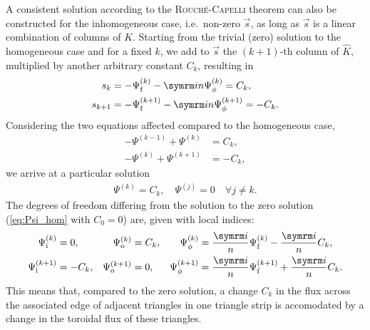 A consistent solution according to the \textsc{Rouché}-\textsc{Capelli} theorem can also be constructed for the inhomogeneous case, i.e.\ non-zero $\vec{s}$, as long as $\vec{s}$ is a linear combination of columns of $K$. Starting from the trivial (zero) solution to the homogeneous case and for a fixed $k$, we add to $\vec{s}$ the $(k+1)$-th column of $\hat{K}$, multiplied by another arbitrary constant $C_{k}$, resulting in
\begin{align}
  s_{k} &= -\Psi_{\fs}^{(k)} - \im n \Psi_{\phi}^{(k)} = C_{k}, \\
  s_{k+1} &= -\Psi_{\fs}^{(k+1)} - \im n \Psi_{\phi}^{(k+1)} = -C_{k}.
\end{align}
Considering the two equations affected compared to the homogeneous case,
\begin{align}
  -\Psi^{(k-1)} + \Psi^{(k)} &= C_{k}, \\
  -\Psi^{(k)} + \Psi^{(k+1)} &= -C_{k},
\end{align}
we arrive at a particular solution
\begin{gather}
  \Psi^{(k)} = C_{k}, \quad \Psi^{(j)} = 0 \quad \forall j \neq k.
\end{gather}
The degrees of freedom differing from the solution to the zero solution (\cref{eq:Psi_hom} with $C_{0} = 0$) are, given with local indices:
\begin{align}
  \Psi_{\inw}^{(k)} &= 0, & \Psi_{\out}^{(k)} &= C_{k}, & \Psi_{\phi}^{(k)} &= \frac{\im}{n} \Psi_{\fs}^{(k)} - \frac{\im}{n} C_{k}, \\
  \Psi_{\inw}^{(k+1)} &= -C_{k}, & \Psi_{\out}^{(k+1)} &= 0, & \Psi_{\phi}^{(k+1)} &= \frac{\im}{n} \Psi_{\fs}^{(k+1)} + \frac{\im}{n} C_{k}.
\end{align}
This means that, compared to the zero solution, a change $C_{k}$ in the flux across the associated edge of adjacent triangles in one triangle strip is accomodated by a change in the toroidal flux of these triangles.

